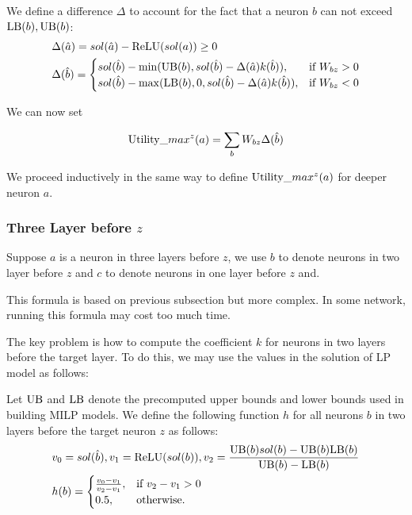 We define a difference $\Delta$ to account for the fact that a neuron $b$ 
can not exceed $\mathrm{LB}(b),\mathrm{UB}(b)$:
	\begin{align*}
		&\Delta(\hat{a}) = sol(\hat{a}) - \mathrm{ReLU}(sol(a)) \geq 0\\
			&\Delta(\hat{b}) =
		\begin{cases}
			sol(\hat{b}) - \min(\mathrm{UB}(b), sol(\hat{b}) - \Delta(\hat{a}) k(\hat{b})), & \text{if }  W_{bz} > 0 \\
			sol(\hat{b}) - \max(\mathrm{LB}(b), 0, sol(\hat{b}) -\Delta(\hat{a}) k(\hat{b})), & \text{if }W_{bz} < 0\\
		\end{cases}
		\end{align*}

We can now set 

$$ \mathrm{Utility}\_max^z(a) = \sum_b W_{bz} \Delta(\hat{b})$$
 
We proceed inductively in the same way to define $\mathrm{Utility}\_max^z(a)$ for deeper neuron $a$.

\iffalse
\subsubsection*{Three Layer before  $z$} 

Suppose $a$ is a neuron in three layers before $z$, we use $b$ to denote neurons in two layer before $z$ and $c$ to denote neurons in one layer before $z$ and. 

This formula is based on previous subsection but more complex. In some network, running this formula may cost too much time. 

The key problem is how to compute the coefficient $k$ for neurons in two layers before the target layer. To do this, we may use the values in the solution of LP model as follows:

\begin{definition}\label{3layer}
Let $\mathrm{UB}$ and $\mathrm{LB}$ denote the precomputed upper bounds and lower bounds used in building MILP models. We define the following function $h$ for all neurons $b$ in two layers before the target neuron $z$ as follows:
	\begin{align}
		&v_0 = sol(\hat{b}), v_1 = \mathrm{ReLU}(sol(b)), v_2 = \frac{\mathrm{UB}(b)sol(b)-\mathrm{UB}(b)\mathrm{LB}(b)}{\mathrm{UB}(b)-\mathrm{LB}(b)}\\
		&h(b) =
		\begin{cases}
			\frac{v_0-v_1}{v_2-v_1}, & \text{if } v_2-v_1 > 0\\
			0.5, & \text{otherwise.}
		\end{cases}
	\end{align} 
\end{definition} 

